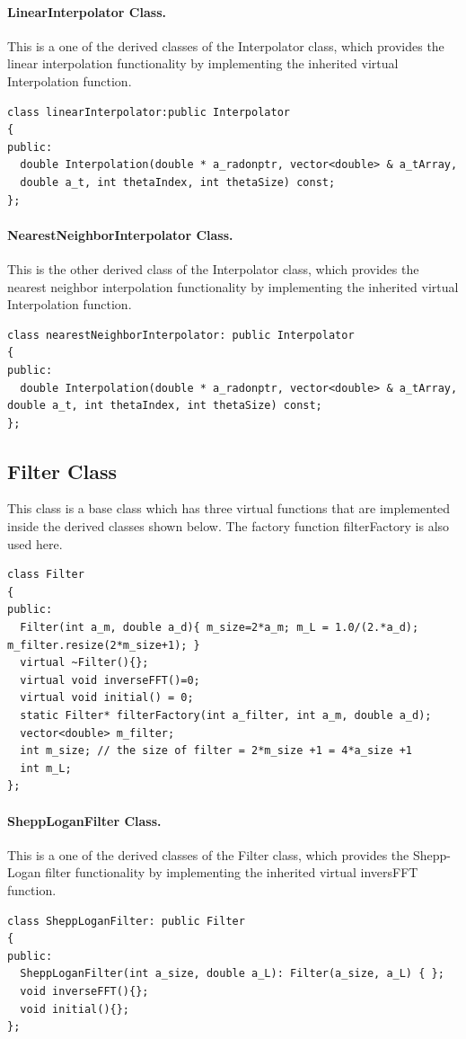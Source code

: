 \paragraph{LinearInterpolator Class.}
This is a one of the derived classes of the Interpolator class, which provides the linear interpolation functionality by implementing the inherited virtual Interpolation function.  
\begin{verbatim}
class linearInterpolator:public Interpolator
{
public:
  double Interpolation(double * a_radonptr, vector<double> & a_tArray, 
  double a_t, int thetaIndex, int thetaSize) const;
};
\end{verbatim}

\paragraph{NearestNeighborInterpolator Class.}
This is the other derived class of the Interpolator class, which provides the nearest neighbor interpolation functionality by implementing the inherited virtual Interpolation function.  
\begin{verbatim}
class nearestNeighborInterpolator: public Interpolator
{
public:
  double Interpolation(double * a_radonptr, vector<double> & a_tArray, double a_t, int thetaIndex, int thetaSize) const;
};
\end{verbatim}

\subsection{Filter Class}
This class is a base class which has three virtual functions that are implemented inside the derived classes shown below. The factory function filterFactory is also used here.
\begin{verbatim}
class Filter
{
public:
  Filter(int a_m, double a_d){ m_size=2*a_m; m_L = 1.0/(2.*a_d); m_filter.resize(2*m_size+1); } 
  virtual ~Filter(){};
  virtual void inverseFFT()=0; 
  virtual void initial() = 0;
  static Filter* filterFactory(int a_filter, int a_m, double a_d);
  vector<double> m_filter;
  int m_size; // the size of filter = 2*m_size +1 = 4*a_size +1
  int m_L;
};  
\end{verbatim}

\paragraph{SheppLoganFilter Class.}
This is a one of the derived classes of the Filter class, which provides the Shepp-Logan filter functionality by implementing the inherited virtual inversFFT function.  
\begin{verbatim}
class SheppLoganFilter: public Filter
{
public:
  SheppLoganFilter(int a_size, double a_L): Filter(a_size, a_L) { }; 
  void inverseFFT(){};
  void initial(){};
};
\end{verbatim}

